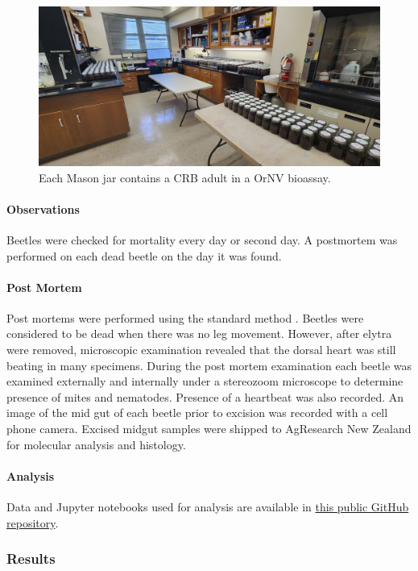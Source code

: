 \documentclass[12pt,letterpaper,english,bibliography=totocnumbered, abstract=on]{scrartcl}
\begin{document}
\begin{figure}[H]
	\centering
	\includegraphics[width=0.7\linewidth]{images/lab}
	\caption{Each Mason jar contains a CRB adult in a OrNV bioassay.}
	\label{fig:lab}
\end{figure}

\paragraph{Observations}

Beetles were checked for mortality every day or second day. A postmortem was performed on each dead beetle on the day it was found.

\paragraph{Post Mortem}

Post mortems were performed using the standard method \cite{AgResearch2023-OrNV-minitest}. Beetles were considered to be dead when there was no leg movement. However, after elytra were removed, microscopic examination revealed that the dorsal heart was still beating in many specimens. During the post mortem examination each beetle was examined externally and internally under a stereozoom microscope to determine presence of mites and nematodes. Presence of a heartbeat was also recorded. An image of the mid gut of each beetle prior to excision was recorded with a cell phone camera. 
Excised midgut samples were shipped to AgResearch New Zealand for molecular analysis and histology.

\paragraph{Analysis}

Data and Jupyter notebooks used for analysis are available in \href{https://github.com/aubreymoore/ornv-bioassay-db}{this public GitHub repository}. 

\clearpage
\subsubsection{Results}
\end{document}
